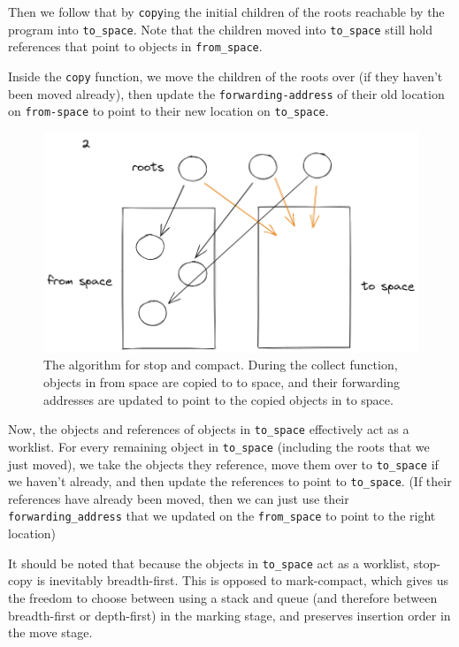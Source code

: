 \documentclass[index]{subfiles}
\begin{document}
Then we follow that by \verb+copy+ing the initial children of the roots reachable by the program into \verb+to_space+. Note that the children moved into \verb+to_space+ still hold references that point to objects in \verb+from_space+.

Inside the \verb+copy+ function, we move the children of the roots over (if they haven't been moved already), then update the \verb+forwarding-address+ of their old location on \verb+from-space+ to point to their new location on \verb+to_space+.

\begin{figure}[H]
    \centering
    \includegraphics[scale=0.3]{pics/visualization-of-worklist.png}
    \caption{The algorithm for stop and compact. During the collect function, objects in from space are copied to to space, and their forwarding addresses are updated to point to the copied objects in to space.}
\end{figure}

Now, the objects and references of objects in \verb+to_space+ effectively act as a worklist. For every remaining object in \verb+to_space+ (including the roots that we just moved), we take the objects they reference, move them over to \verb+to_space+ if we haven't already, and then update the references to point to \verb+to_space+. (If their references have already been moved, then we can just use their \verb+forwarding_address+ that we updated on the \verb+from_space+ to point to the right location) 

It should be noted that because the objects in \verb+to_space+ act as a worklist, stop-copy is inevitably breadth-first. This is opposed to mark-compact, which gives us the freedom to choose between using a stack and queue (and therefore between breadth-first or depth-first) in the marking stage, and preserves insertion order in the move stage.
\end{document}
